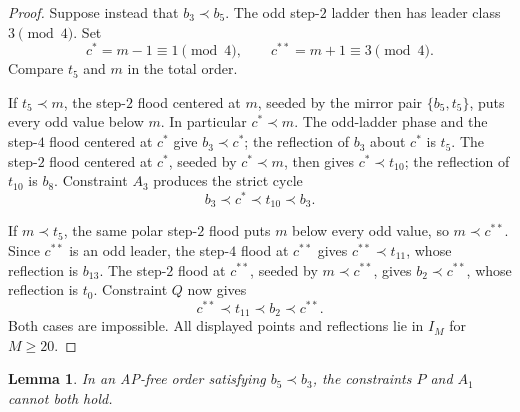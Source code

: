 \documentclass[11pt]{article}
\newtheorem{lemma}[theorem]{Lemma}
\newcommand{\IM}{I_M}
\begin{document}
\begin{proof}
Suppose instead that $b_3\prec b_5$.  The odd step-$2$ ladder then has leader
class $3\pmod4$.  Set
\[
  c^*=m-1\equiv1\pmod4,
  \qquad
  c^{**}=m+1\equiv3\pmod4.
\]
Compare $t_5$ and $m$ in the total order.

If $t_5\prec m$, the step-$2$ flood centered at $m$, seeded by the mirror
pair $\{b_5,t_5\}$, puts every odd value below $m$.  In particular
$c^*\prec m$.  The odd-ladder phase and the step-$4$ flood centered at $c^*$
give $b_3\prec c^*$; the reflection of $b_3$ about $c^*$ is $t_5$.
The step-$2$ flood centered at $c^*$, seeded by $c^*\prec m$, then gives
$c^*\prec t_{10}$; the reflection of $t_{10}$ is $b_8$.  Constraint $A_3$
produces the strict cycle
\[
  b_3\prec c^*\prec t_{10}\prec b_3.
\]

If $m\prec t_5$, the same polar step-$2$ flood puts $m$ below every odd
value, so $m\prec c^{**}$.  Since $c^{**}$ is an odd leader, the step-$4$
flood at $c^{**}$ gives $c^{**}\prec t_{11}$, whose reflection is $b_{13}$.
The step-$2$ flood at $c^{**}$, seeded by $m\prec c^{**}$, gives
$b_2\prec c^{**}$, whose reflection is $t_0$.  Constraint $Q$ now gives
\[
  c^{**}\prec t_{11}\prec b_2\prec c^{**}.
\]
Both cases are impossible.  All displayed points and reflections lie in
$\IM$ for $M\geq20$.
\end{proof}

\begin{lemma}\label{lem:flip}
In an AP-free order satisfying $b_5\prec b_3$, the constraints $P$ and $A_1$
cannot both hold.
\end{lemma}
\end{document}
